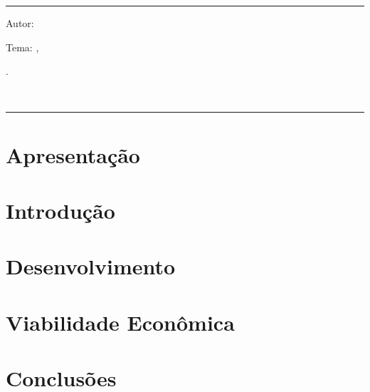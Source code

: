 


\hrule	%
\begin{center} %
\begin{minipage}[c]{12.5cm} %
Autor: \imprimirautor

Tema: \imprimirtitulo 
\imprimirlocal, 
\imprimirorientador\\
\hspace{0.5cm}
\parbox[t]{\textwidth}{\imprimirinstituicao
\imprimirdata.}\\
\hspace{0.5cm}
\end{minipage}
\end{center}
\hrule

\vspace{1cm}

\chapter{Apresentação}

\chapter{Introdução} %


\chapter{Desenvolvimento}


\chapter{Viabilidade Econômica}


\chapter{Conclusões}

